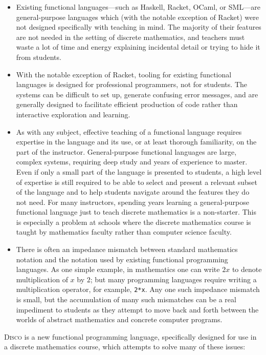 \documentclass[submission,copyright,creativecommons]{eptcs}
\newcommand{\disco}{\textsc{Disco}\xspace}
\begin{document}
\begin{itemize}
\item Existing functional languages---such as Haskell, Racket, OCaml,
  or SML---are general-purpose languages which (with the notable
  exception of Racket) were not designed specifically with teaching in
  mind.  The majority of their features are not needed in the setting
  of discrete mathematics, and teachers must waste a lot of time and
  energy explaining incidental detail or trying to hide it from
  students.
\item With the notable exception of Racket, tooling for existing
  functional languages is designed for professional programmers, not
  for students.  The systems can be difficult to set up, generate
  confusing error messages, and are generally designed to facilitate
  efficient production of code rather than interactive exploration and
  learning.
\item As with any subject, effective teaching of a functional language
  requires expertise in the language and its use, or at least thorough
  familiarity, on the part of the instructor. General-purpose
  functional languages are large, complex systems, requiring deep
  study and years of experience to master.  Even if only a small part
  of the language is presented to students, a high level of expertise
  is still required to be able to select and present a relevant subset
  of the language and to help students navigate around the features
  they do not need.  For many instructors, spending years learning a
  general-purpose functional language just to teach discrete
  mathematics is a non-starter.  This is especially a problem at
  schools where the discrete mathematics course is taught by
  mathematics faculty rather than computer science faculty.
\item There is often an impedance mismatch between standard
  mathematics notation and the notation used by existing functional
  programming languages.  As one simple example, in mathematics one
  can write $2x$ to denote multiplication of $x$ by $2$; but many
  programming languages require writing a multiplication operator, for
  example, \texttt{2*x}.  Any one such impedance mismatch is small,
  but the accumulation of many such mismatches can be a real
  impediment to students as they attempt to move back and forth
  between the worlds of abstract mathematics and concrete computer
  programs.
\end{itemize}

\disco is a new functional programming language, specifically designed
for use in a discrete mathematics course, which attempts to solve many
of these issues:
\end{document}
